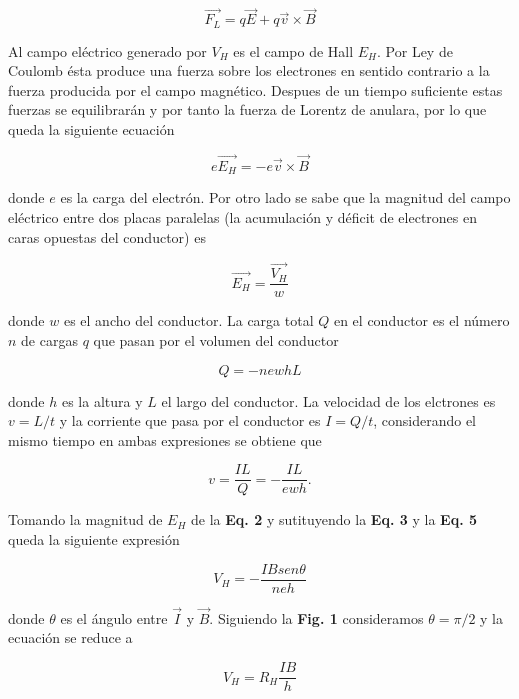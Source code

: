 \documentclass[twocolumn,showpacs,preprintnumbers,amsmath,amssymb]{revtex4-1}
\begin{document}
\begin{equation}
\vec{F_L} = q\vec{E} + q\vec{v} \times \vec{B}
\end{equation}

Al campo eléctrico generado por $V_H$ es el campo de Hall $E_H$. Por Ley de Coulomb ésta produce una fuerza sobre
los electrones en sentido contrario a la fuerza producida por el campo magnético. Despues de un tiempo suficiente estas fuerzas
se equilibrarán y por tanto la fuerza de Lorentz de anulara, por lo que queda la siguiente ecuación

\begin{equation}
e\vec{E_H} = -e\vec{v} \times \vec{B}
\end{equation}

donde $e$ es la carga del electrón. Por otro lado se sabe que la magnitud del campo eléctrico entre dos placas paralelas
(la acumulación y déficit de electrones en caras opuestas del conductor) es

\begin{equation}
\vec{E_H} = \frac{\vec{V_H}}{w}
\end{equation}

donde $w$ es el ancho del conductor. La carga total $Q$ en el conductor es el número $n$ de cargas $q$ que pasan por el
volumen del conductor

\begin{equation}
Q = -newhL
\end{equation}

donde $h$ es la altura y $L$ el largo del conductor. La velocidad de los elctrones es $v = L/t$ y la corriente que pasa
por el conductor es $I = Q/t$, considerando el mismo tiempo en ambas expresiones se obtiene que

\begin{equation}
v = \frac{IL}{Q} = -\frac{IL}{ewh}.
\end{equation}

Tomando la magnitud de $E_H$ de la \textbf{Eq. 2} y sutituyendo la \textbf{Eq. 3} y la \textbf{Eq. 5} queda la siguiente expresión

\begin{equation}
V_H = -\frac{I B sen\theta}{n e h}
\end{equation}

donde $\theta$ es el ángulo entre $\vec{I}$ y $\vec{B}$. Siguiendo la \textbf{Fig. 1} consideramos $\theta = \pi/2$ y la ecuación
se reduce a

\begin{equation}
V_H = R_H \frac{I B}{h}
\end{equation}
\end{document}
